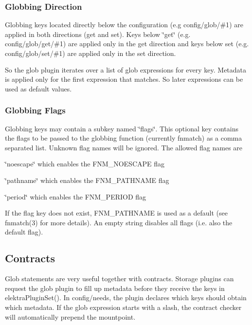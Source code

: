 \subsubsection*{Globbing Direction}

Globbing keys located directly below the configuration (e.\+g {\ttfamily config/glob/\#1}) are applied in both directions (get and set). Keys below \char`\"{}get\char`\"{} (e.\+g. {\ttfamily config/glob/get/\#1}) are applied only in the get direction and keys below set (e.\+g. {\ttfamily config/glob/set/\#1}) are applied only in the set direction.

So the glob plugin iterates over a list of glob expressions for every key. Metadata is applied only for the first expression that matches. So later expressions can be used as default values.

\subsubsection*{Globbing Flags}

Globbing keys may contain a subkey named \char`\"{}flags\char`\"{}. This optional key contains the flags to be passed to the globbing function (currently fnmatch) as a comma separated list. Unknown flag names will be ignored. The allowed flag names are


\begin{DoxyItemize}
\item \char`\"{}noescape\char`\"{} which enables the F\+N\+M\+\_\+\+N\+O\+E\+S\+C\+A\+P\+E flag
\item \char`\"{}pathname\char`\"{} which enables the F\+N\+M\+\_\+\+P\+A\+T\+H\+N\+A\+M\+E flag
\item \char`\"{}period\char`\"{} which enables the F\+N\+M\+\_\+\+P\+E\+R\+I\+O\+D flag
\end{DoxyItemize}

If the flag key does not exist, F\+N\+M\+\_\+\+P\+A\+T\+H\+N\+A\+M\+E is used as a default (see fnmatch(3) for more details). An empty string disables all flags (i.\+e. also the default flag). \subsection*{Contracts}

Glob statements are very useful together with contracts. Storage plugins can request the glob plugin to fill up metadata before they receive the keys in {\ttfamily elektra\+Plugin\+Set()}. In {\ttfamily config/needs}, the plugin declares which keys should obtain which metadata. If the glob expression starts with a slash, the contract checker will automatically prepend the mountpoint.

